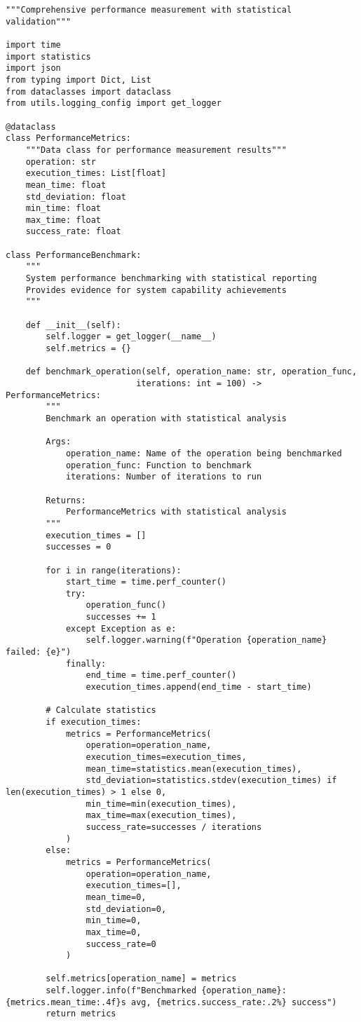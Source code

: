 \documentclass[12pt,a4paper]{article}
\begin{document}
\begin{verbatim}
"""Comprehensive performance measurement with statistical validation"""

import time
import statistics
import json
from typing import Dict, List
from dataclasses import dataclass
from utils.logging_config import get_logger

@dataclass
class PerformanceMetrics:
    """Data class for performance measurement results"""
    operation: str
    execution_times: List[float]
    mean_time: float
    std_deviation: float
    min_time: float
    max_time: float
    success_rate: float

class PerformanceBenchmark:
    """
    System performance benchmarking with statistical reporting
    Provides evidence for system capability achievements
    """
    
    def __init__(self):
        self.logger = get_logger(__name__)
        self.metrics = {}
    
    def benchmark_operation(self, operation_name: str, operation_func, 
                          iterations: int = 100) -> PerformanceMetrics:
        """
        Benchmark an operation with statistical analysis
        
        Args:
            operation_name: Name of the operation being benchmarked
            operation_func: Function to benchmark
            iterations: Number of iterations to run
            
        Returns:
            PerformanceMetrics with statistical analysis
        """
        execution_times = []
        successes = 0
        
        for i in range(iterations):
            start_time = time.perf_counter()
            try:
                operation_func()
                successes += 1
            except Exception as e:
                self.logger.warning(f"Operation {operation_name} failed: {e}")
            finally:
                end_time = time.perf_counter()
                execution_times.append(end_time - start_time)
        
        # Calculate statistics
        if execution_times:
            metrics = PerformanceMetrics(
                operation=operation_name,
                execution_times=execution_times,
                mean_time=statistics.mean(execution_times),
                std_deviation=statistics.stdev(execution_times) if len(execution_times) > 1 else 0,
                min_time=min(execution_times),
                max_time=max(execution_times),
                success_rate=successes / iterations
            )
        else:
            metrics = PerformanceMetrics(
                operation=operation_name,
                execution_times=[],
                mean_time=0,
                std_deviation=0,
                min_time=0,
                max_time=0,
                success_rate=0
            )
        
        self.metrics[operation_name] = metrics
        self.logger.info(f"Benchmarked {operation_name}: {metrics.mean_time:.4f}s avg, {metrics.success_rate:.2%} success")
        return metrics
\end{verbatim}
\end{document}
